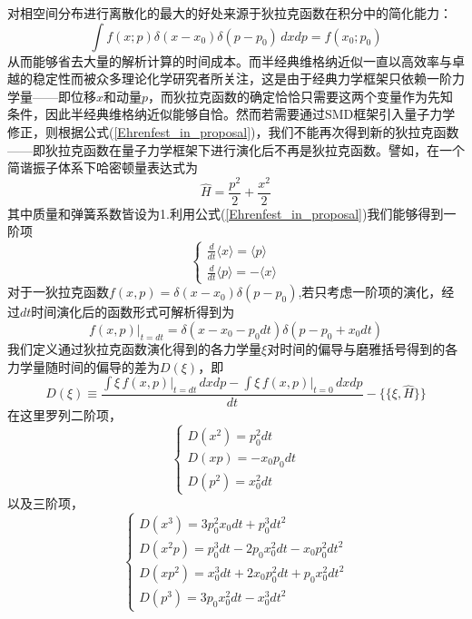 对相空间分布进行离散化的最大的好处来源于狄拉克函数在积分中的简化能力：
\begin{equation}
	\int f(x;p) \delta (x- x_0) \delta (p- p_0) \, dx dp = f(x_0;p_0)
\end{equation}
从而能够省去大量的解析计算的时间成本。而半经典维格纳近似一直以高效率与卓越的稳定性而被众多理论化学研究者所关注，这是由于经典力学框架只依赖一阶力学量——即位移$x$和动量$p$，而狄拉克函数的确定恰恰只需要这两个变量作为先知条件，因此半经典维格纳近似能够自恰。然而若需要通过SMD框架引入量子力学修正，则根据公式(\ref{Ehrenfest_in_proposal})，我们不能再次得到新的狄拉克函数——即狄拉克函数在量子力学框架下进行演化后不再是狄拉克函数。譬如，在一个简谐振子体系下哈密顿量表达式为
\begin{equation}
	\hat{H} = \frac{p^2}{2} + \frac{x^2}{2}
\end{equation}
其中质量和弹簧系数皆设为1.利用公式(\ref{Ehrenfest_in_proposal})我们能够得到一阶项
\begin{equation}
	\begin{cases}
	\frac{d }{dt}\langle x \rangle = \langle p \rangle \\
	\frac{d }{dt}\langle p \rangle = - \langle x \rangle
	\end{cases}
\end{equation}
对于一狄拉克函数$f(x,p) = \delta(x-x_0)\delta(p-p_0)$,若只考虑一阶项的演化，经过$dt$时间演化后的函数形式可解析得到为
\begin{equation}
f(x,p) \big|_{t=dt} = \delta(x-x_0 - p_0dt) \delta(p-p_0+x_0dt)
\end{equation}
我们定义通过狄拉克函数演化得到的各力学量$\xi$对时间的偏导与磨雅括号得到的各力学量随时间的偏导的差为$D(\xi)$，即
\begin{equation}
	D(\xi) \equiv \frac{\int \xi \, f(x,p) \big|_{t=dt} \, dx dp - \int \xi \, f(x,p) \big|_{t=0} \, dx dp }{dt} - \{\{\xi,\hat{H}\}\}
\end{equation}
在这里罗列二阶项，
\begin{equation}
	\begin{cases}
		D(x^2) = p_0^2 dt \\
		D(x p) = - x_0 p_0 dt \\
		D(p^2) = x_0^2 dt
	\end{cases}
\end{equation}
以及三阶项，
\begin{equation}
	\begin{cases}
		D(x^3) = 3 p_0^2 x_0 dt + p_0^3 dt^2\\
		D(x^2 p) = p_0^3 dt - 2 p_0 x_0^2 dt - x_0p_0^2 dt^2\\
		D(x p^2) = x_0^3 dt + 2x_0 p_0^2 dt + p_0 x_0^2 dt^2 \\
		D(p^3) = 3 p_0 x_0^2 dt - x_0^3 dt^2
	\end{cases}
\end{equation}
